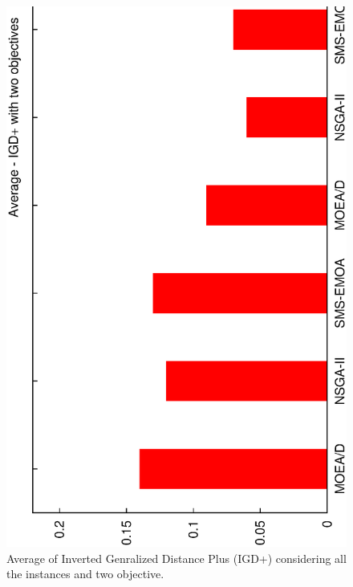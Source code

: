 \begin{figure}[]
\centering
\includegraphics[scale=0.25,angle=-90]{img/bar_IGD_2obj.eps}
\caption{Average of Inverted Genralized Distance Plus (IGD+) considering all the instances and two objective.}
\label{fig_sim}
\end{figure}

